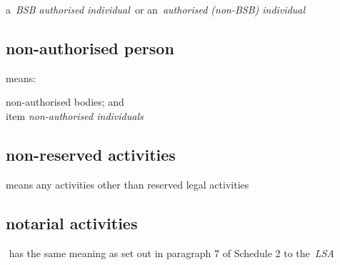   a~\emph{BSB authorised individual~}or an~\emph{authorised (non-BSB)
  individual} \subsection{non-authorised person } means:
\al \item  non-authorised bodies; and
 \\item \emph{non-authorised individuals}\la  \subsection{non-reserved activities } means any activities other than
  reserved legal activities  \subsection{notarial activities} has the same meaning as set out in
  paragraph 7 of Schedule 2 to the~\emph{LSA} 
  
